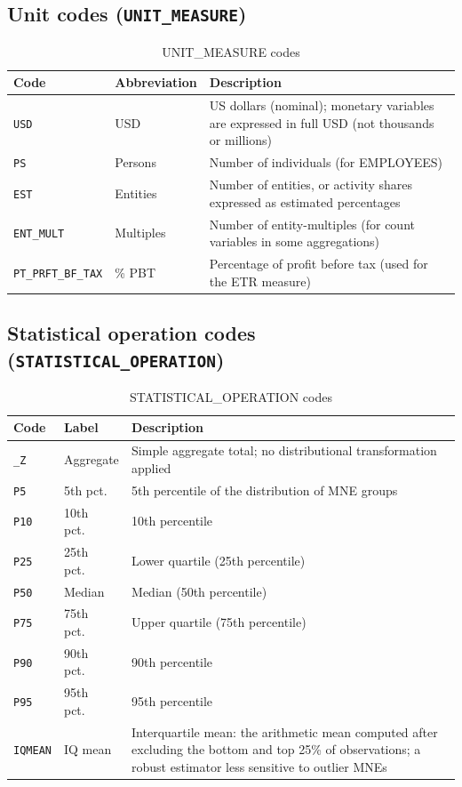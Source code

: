 \documentclass[11pt,a4paper]{article}
\newcommand{\code}[1]{\texttt{#1}}
\begin{document}
\subsection{Unit codes (\texttt{UNIT\_MEASURE})}

\begin{table}[H]
\centering
\caption{UNIT\_MEASURE codes}
\label{tab:units}
\begin{tabular}{@{}llp{8cm}@{}}
\toprule
Code & Abbreviation & Description \\
\midrule
\code{USD}            & USD & US dollars (nominal); monetary variables are expressed in full USD (not thousands or millions) \\
\code{PS}             & Persons & Number of individuals (for EMPLOYEES) \\
\code{EST}            & Entities & Number of entities, or activity shares expressed as estimated percentages \\
\code{ENT\_MULT}      & Multiples & Number of entity-multiples (for count variables in some aggregations) \\
\code{PT\_PRFT\_BF\_TAX} & \% PBT & Percentage of profit before tax (used for the ETR measure) \\
\bottomrule
\end{tabular}
\end{table}

\subsection{Statistical operation codes (\texttt{STATISTICAL\_OPERATION})}

\begin{table}[H]
\centering
\caption{STATISTICAL\_OPERATION codes}
\label{tab:statops}
\begin{tabular}{@{}llp{9.5cm}@{}}
\toprule
Code & Label & Description \\
\midrule
\code{\_Z} & Aggregate & Simple aggregate total; no distributional transformation applied \\
\code{P5}  & 5th pct.\ & 5th percentile of the distribution of MNE groups \\
\code{P10} & 10th pct.\ & 10th percentile \\
\code{P25} & 25th pct.\ & Lower quartile (25th percentile) \\
\code{P50} & Median & Median (50th percentile) \\
\code{P75} & 75th pct.\ & Upper quartile (75th percentile) \\
\code{P90} & 90th pct.\ & 90th percentile \\
\code{P95} & 95th pct.\ & 95th percentile \\
\code{IQMEAN} & IQ mean & Interquartile mean: the arithmetic mean computed after excluding the bottom and top 25\% of observations; a robust estimator less sensitive to outlier MNEs \\
\bottomrule
\end{tabular}
\end{table}
\end{document}
